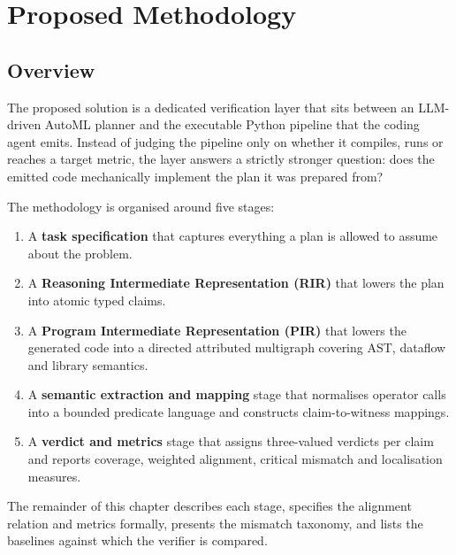 \chapter{Proposed Methodology}
\label{ch:method}

\section{Overview}

The proposed solution is a dedicated verification layer that sits
between an LLM-driven AutoML planner and the executable Python
pipeline that the coding agent emits. Instead of judging the
pipeline only on whether it compiles, runs or reaches a target
metric, the layer answers a strictly stronger question: does the
emitted code mechanically implement the plan it was prepared from?

The methodology is organised around five stages:

\begin{enumerate}
    \item A \textbf{task specification} that captures everything a
    plan is allowed to assume about the problem.
    \item A \textbf{Reasoning Intermediate Representation (RIR)}
    that lowers the plan into atomic typed claims.
    \item A \textbf{Program Intermediate Representation (PIR)}
    that lowers the generated code into a directed attributed
    multigraph covering AST, dataflow and library semantics.
    \item A \textbf{semantic extraction and mapping} stage that
    normalises operator calls into a bounded predicate language and
    constructs claim-to-witness mappings.
    \item A \textbf{verdict and metrics} stage that assigns
    three-valued verdicts per claim and reports coverage, weighted
    alignment, critical mismatch and localisation measures.
\end{enumerate}

The remainder of this chapter describes each stage, specifies the
alignment relation and metrics formally, presents the mismatch
taxonomy, and lists the baselines against which the verifier is
compared.

